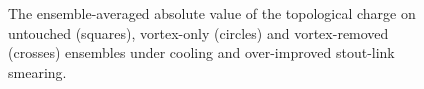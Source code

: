 \documentclass[
 reprint,
 amsmath,amssymb,
 aps,
prd,
]{revtex4-1}
\begin{document}
\begin{figure}[thpb]
\caption{The ensemble-averaged absolute value of the topological charge on untouched (squares), vortex-only (circles) and vortex-removed (crosses) ensembles under cooling  and over-improved stout-link smearing. }
\label{Fig:QvsSw}
\end{figure}
\end{document}
